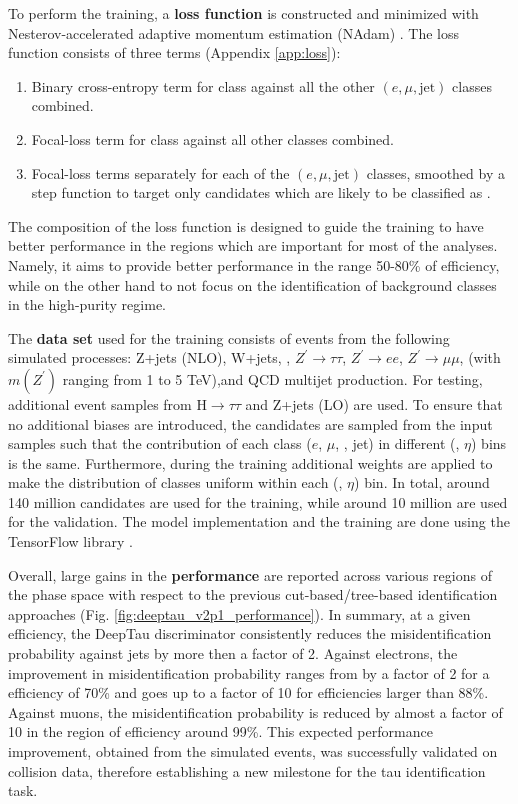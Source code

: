 To perform the training, a \textbf{loss function} is constructed and minimized with Nesterov-accelerated adaptive momentum estimation (NAdam) \cite{dozat2016incorporating}. The loss function consists of three terms (Appendix \ref{app:loss}):
\begin{enumerate}
    \item Binary cross-entropy term for \tauh class against all the other $(e, \mu, \text{jet})$ classes combined.
    \item Focal-loss \cite{lin2017focal} term for \tauh class against all other classes combined.
    \item Focal-loss terms separately for each of the $(e, \mu, \text{jet})$ classes, smoothed by a step function to target only \tauh candidates which are likely to be classified as \tauh.
\end{enumerate}
The composition of the loss function is designed to guide the training to have better performance in the regions which are important for most of the analyses. Namely, it aims to provide better performance in the range 50-80\% of \tauh efficiency, while on the other hand to not focus on the identification of background classes in the high-purity regime.   

The \textbf{data set} used for the training consists of events from the following simulated processes: Z+jets (NLO), W+jets, \ttbar, $Z^{'} \to \tau \tau$, $Z^{'} \to ee$, $Z^{'} \to \mu \mu$, (with $m(Z^{'})$ ranging from 1 to 5 TeV),and QCD multijet production. For testing, additional event samples from $\text{H} \to \tau\tau$ and Z+jets (LO) are used. To ensure that no additional biases are introduced, the \tauh candidates are sampled from the input samples such that the contribution of each class ($e$, $\mu$, \tauh, jet) in different (\pt, $\eta$) bins is the same. Furthermore, during the training additional weights are applied to make the distribution of classes uniform within each (\pt, $\eta$) bin. In total, around 140 million \tauh candidates are used for the training, while around 10 million are used for the validation. The model implementation and the training are done using the TensorFlow library \cite{tensorflow2015-whitepaper}. 

Overall, large gains in the \textbf{performance} are reported across various regions of the phase space with respect to the previous cut-based/tree-based \tauh identification approaches (Fig. \ref{fig:deeptau_v2p1_performance}). In summary, at a given \tauh efficiency, the DeepTau discriminator consistently reduces the misidentification probability against jets by more then a factor of 2. Against electrons, the improvement in misidentification probability ranges from by a factor of 2 for a \tauh efficiency of 70\% and goes up to a factor of 10 for \tauh efficiencies larger than 88\%. Against muons, the misidentification probability is reduced by almost a factor of 10 in the region of \tauh efficiency around 99\%. This expected performance improvement, obtained from the simulated events, was successfully validated on collision data, therefore establishing a new milestone for the tau identification task. 


